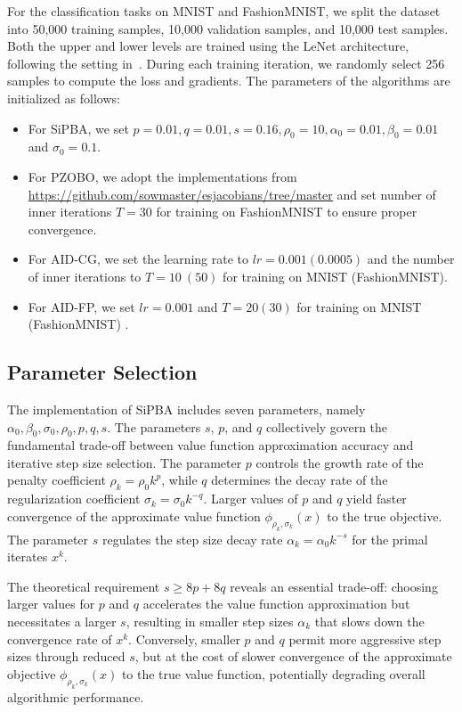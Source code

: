 \documentclass{article}
\begin{document}
   For the classification tasks on MNIST and FashionMNIST, we split the dataset into 50,000 training samples, 10,000 validation samples, and 10,000 test samples. Both the upper and lower levels are trained using the LeNet architecture, following the setting in~\cite{sow2022convergence}. During each training iteration, we randomly select 256 samples to compute the loss and gradients.
    The parameters of the algorithms are initialized as follows:
    \begin{itemize}
        \item For SiPBA, we set $p = 0.01,q = 0.01,s = 0.16,\rho_0 = 10,\alpha_0 = 0.01,\beta_0 = 0.01$ and $\sigma_0 = 0.1.$
        \item For PZOBO, we adopt the implementations from \url{https://github.com/sowmaster/esjacobians/tree/master} and set number of inner iterations  $T = 30$ for training on FashionMNIST to ensure proper convergence.
        \item For AID-CG, we set the learning rate to $lr = 0.001(0.0005)$ and the number of inner iterations to $T = 10\ (50)$ for training on MNIST (FashionMNIST).
        \item For AID-FP, we set $lr = 0.001$ and $T = 20(30)$ for training on MNIST (FashionMNIST) .
    \end{itemize}


    
    \subsection{Parameter Selection}\label{param_select}
    The implementation of SiPBA includes seven parameters, namely $\alpha_0,\beta_0,\sigma_0,\rho_0,p,q,s$.
    The parameters $s$, $p$, and $q$ collectively govern the fundamental trade-off between value function approximation accuracy and iterative step size selection. The parameter $p$ controls the growth rate of the penalty coefficient $\rho_k = \rho_0 k^p$, while $q$ determines the decay rate of the regularization coefficient $\sigma_k = \sigma_0 k^{-q}$. Larger values of $p$ and $q$ yield faster convergence of the approximate value function $\phi_{\rho_k,\sigma_k}(x)$ to the true objective. The parameter $s$ regulates the step size decay rate $\alpha_k = \alpha_0 k^{-s}$ for the primal iterates $x^k$. 

    The theoretical requirement $s \geq 8p + 8q$ reveals an essential trade-off: choosing larger values for $p$ and $q$ accelerates the value function approximation but necessitates a larger $s$, resulting in smaller step sizes $\alpha_k$ that slows down the convergence rate of $x^k$. Conversely, smaller $p$ and $q$ permit more aggressive step sizes through reduced $s$, but at the cost of slower convergence of the approximate objective $\phi_{\rho_k,\sigma_k}(x)$ to the true value function, potentially degrading overall algorithmic performance. 
    
\end{document}

